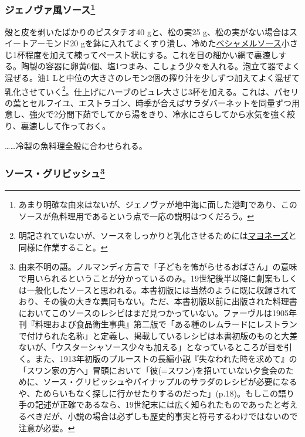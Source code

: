 \begin{recette}
\atoaki{}

\hypertarget{sauce-genoise-froids}{%
\subsubsection[ジェノヴァ風ソース]{\texorpdfstring{ジェノヴァ風ソース\footnote{あまり明確な由来はないが、ジェノヴァが地中海に面した港町であり、このソースが魚料理用であるという点で一応の説明はつくだろう。}}{ジェノヴァ風ソース}}\label{sauce-genoise-froids}}



殻と皮を剥いたばかりのピスタチオ40 gと、松の実25
g、松の実がない場合はスイートアーモンド20
gを鉢に入れてよくすり潰し、冷めた\protect\hyperlink{sauce-bechamel}{ベシャメルソース}小さじ1杯程度を加えて練ってペースト状にする。これを目の細かい網で裏漉しする。陶製の容器に卵黄6個、塩1つまみ、こしょう少々を入れる。泡立て器でよく混ぜる。油1
Lと中位の大きさのレモン2個の搾り汁を少しずつ加えてよく混ぜて乳化させていく\footnote{明記されていないが、ソースをしっかりと乳化させるためには\protect\hyperlink{mayonnaise}{マヨネーズ}と同様に作業すること。}。仕上げにハーブのピュレ大さじ3杯を加える。これは、パセリの葉とセルフイユ、エストラゴン、時季が合えばサラダバーネットを同量ずつ用意し、強火で2分間下茹でしてから湯をきり、冷水にさらしてから水気を強く絞り、裏漉しして作っておく。

\ldots{}\ldots{}冷製の魚料理全般に合わせられる。

\atoaki{}

\hypertarget{sauce-gribiche}{%
\subsubsection[ソース・グリビッシュ]{\texorpdfstring{ソース・グリビッシュ\footnote{由来不明の語。ノルマンディ方言で「子どもを怖がらせるおばさん」の意味で用いられるということが分かっているのみ。19世紀後半以降に創案もしくは一般化したソースと思われる。本書初版には当然のように既に収録されており、その後の大きな異同もない。ただ、本書初版以前に出版された料理書においてこのソースのレシピはまだ見つかっていない。ファーヴルは1905年刊『料理および食品衛生事典』第二版で「ある種のレムラードにレストランで付けられた名称」と定義し、掲載しているレシピは本書初版のものと大差ないが、「ウスターシャソース少々も加える」となっているところが目を引く。また、1913年初版のプルーストの長編小説『失なわれた時を求めて』の「スワン家の方へ」冒頭において「彼(=スワン)を招いていない夕食会のために、ソース・グリビッシュやパイナップルのサラダのレシピが必要になるや、ためらいもなく探しに行かせたりするのだった」(p.18)。もしこの語り手の記述が正確であるなら、19世紀末には広く知られたものであったと考えるべきだが、小説の場合は必ずしも歴史的事実と符号するわけではないので注意が必要。}}{ソース・グリビッシュ}}\label{sauce-gribiche}}


\end{recette}
